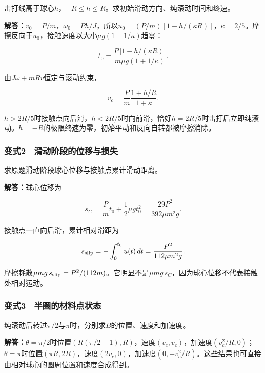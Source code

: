 \documentclass[12pt,a4paper,fontset=fandol]{ctexart}
\begin{document}
击打线高于球心\(h\)，\(-R\leq h\leq R\)。求初始滑动方向、纯滚动时间和终速。

\textbf{解答：}\(v_0=P/m\)，\(\omega_0=Ph/J\)，所以\(u_0=(P/m)[1-h/(\kappa R)]\)，\(\kappa=2/5\)。摩擦反向于\(u_0\)，接触速度以大小\(\mu g(1+1/\kappa)\)趋零：

\[
t_0=\frac{P\,|1-h/(\kappa R)|}
{m\mu g(1+1/\kappa)}.
\]

由\(J\omega+mRv\)恒定与滚动约束，

\[
v_c=\frac Pm\frac{1+h/R}{1+\kappa}.
\]

\(h>2R/5\)时接触点向后滑，\(h<2R/5\)时向前滑，恰好\(h=2R/5\)时击打后立即纯滚动。\(h=-R\)的极限终速为零，初始平动和反向自转都被摩擦消除。

\subsubsection{变式2　滑动阶段的位移与损失}\label{ux53d8ux5f0f2-ux6ed1ux52a8ux9636ux6bb5ux7684ux4f4dux79fbux4e0eux635fux5931}

求原题滑动阶段球心位移与接触点累计滑动距离。

\textbf{解答：}球心位移为

\[
s_C=\frac Pm t_0+\frac12\mu gt_0^2
=\frac{29P^2}{392\mu m^2g}.
\]

接触点一直向后滑，累计相对滑距为

\[
s_{\rm slip}=-\int_0^{t_0}u(t)\,dt
=\frac{P^2}{112\mu m^2g}.
\]

摩擦耗散\(\mu mg\,s_{\rm slip}=P^2/(112m)\)。它明显不是\(\mu mg\,s_C\)，因为球心位移不代表接触处相对运动。

\subsubsection{变式3　半圈的材料点状态}\label{ux53d8ux5f0f3-ux534aux5708ux7684ux6750ux6599ux70b9ux72b6ux6001}

纯滚动后转过\(\pi/2\)与\(\pi\)时，分别求\(B\)的位置、速度和加速度。

\textbf{解答：}\(\theta=\pi/2\)时位置\((R(\pi/2-1),R)\)，速度\((v_c,v_c)\)，加速度\((v_c^2/R,0)\)；\(\theta=\pi\)时位置\((\pi R,2R)\)，速度\((2v_c,0)\)，加速度\((0,-v_c^2/R)\)。这些结果也可直接由相对球心的圆周位置和速度合成得到。
\end{document}
